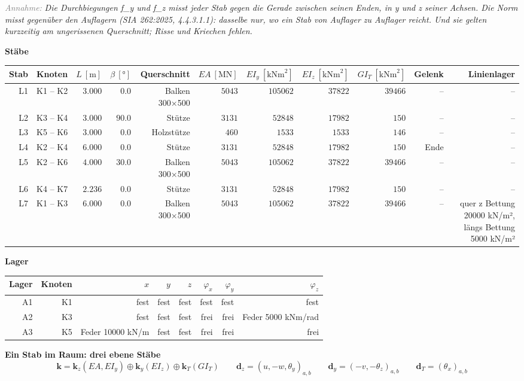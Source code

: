 \documentclass[11pt,a4paper]{article}
\newcommand{\hinweis}[2]{\par\noindent\textcolor{gray}{\textit{#1:}} \textit{#2}\par}
\begin{document}
\hinweis{Annahme}{Die Durchbiegungen f\_y und f\_z misst jeder Stab gegen die Gerade zwischen seinen Enden, in y und z seiner Achsen. Die Norm misst gegenüber den Auflagern (SIA 262:2025, 4.4.3.1.1): dasselbe nur, wo ein Stab von Auflager zu Auflager reicht. Und sie gelten kurzzeitig am ungerissenen Querschnitt; Risse und Kriechen fehlen.}
\noindent\textbf{Stäbe}
\begin{longtable}{rrrrrrrrrrr}
\hline
Stab & Knoten & $L\ [\mathrm{m}]$ & $\beta\ [°]$ & Querschnitt & $EA\ [\mathrm{MN}]$ & $EI_y\ [\mathrm{kNm}^{2}]$ & $EI_z\ [\mathrm{kNm}^{2}]$ & $GI_T\ [\mathrm{kNm}^{2}]$ & Gelenk & Linienlager \\
\hline
\endhead
L1 & K1 – K2 & $3.000$ & $0.0$ & Balken 300×500 & $5043$ & $105062$ & $37822$ & $39466$ & – & – \\
L2 & K3 – K4 & $3.000$ & $90.0$ & Stütze & $3131$ & $52848$ & $17982$ & $150$ & – & – \\
L3 & K5 – K6 & $3.000$ & $0.0$ & Holzstütze & $460$ & $1533$ & $1533$ & $146$ & – & – \\
L4 & K2 – K4 & $6.000$ & $0.0$ & Stütze & $3131$ & $52848$ & $17982$ & $150$ & Ende & – \\
L5 & K2 – K6 & $4.000$ & $30.0$ & Balken 300×500 & $5043$ & $105062$ & $37822$ & $39466$ & – & – \\
L6 & K4 – K7 & $2.236$ & $0.0$ & Stütze & $3131$ & $52848$ & $17982$ & $150$ & – & – \\
L7 & K1 – K3 & $6.000$ & $0.0$ & Balken 300×500 & $5043$ & $105062$ & $37822$ & $39466$ & – & quer z Bettung 20000 kN/m², längs Bettung 5000 kN/m² \\
\hline
\end{longtable}
\noindent\textbf{Lager}
\begin{longtable}{rrrrrrrr}
\hline
Lager & Knoten & $x$ & $y$ & $z$ & $\varphi_x$ & $\varphi_y$ & $\varphi_z$ \\
\hline
\endhead
A1 & K1 & fest & fest & fest & fest & fest & fest \\
A2 & K3 & fest & fest & fest & frei & frei & Feder 5000 kNm/rad \\
A3 & K5 & Feder 10000 kN/m & fest & fest & frei & frei & frei \\
\hline
\end{longtable}
\noindent\textbf{Ein Stab im Raum: drei ebene Stäbe}
\begin{equation*}
\mathbf{k} = \mathbf{k}_{z}(EA, EI_y) \oplus \mathbf{k}_{y}(EI_z) \oplus \mathbf{k}_{T}(GI_T) \qquad \mathbf{d}_{z} = (u, -w, \theta_y)_{a,b} \qquad \mathbf{d}_{y} = (-v, -\theta_z)_{a,b} \qquad \mathbf{d}_{T} = (\theta_x)_{a,b}
\end{equation*}
\end{document}
